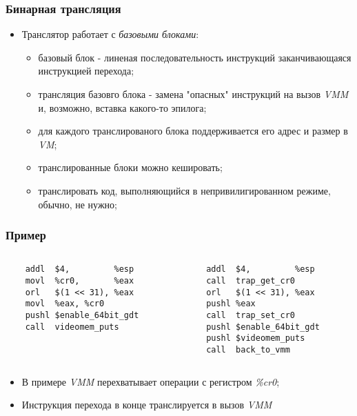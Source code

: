\begin{frame}
\frametitle{Бинарная трансляция}
\begin{itemize}
  \item Транслятор работает с \emph{базовыми блоками}:
    \begin{itemize}
      \item базовый блок - линеная последовательность инструкций заканчивающаяся
            инструкцией перехода;
      \item трансляция базовго блока - замена "опасных" инструкций на вызов
            \emph{VMM} и, возможно, вставка какого-то эпилога;
      \item для каждого транслированого блока поддерживается его адрес и размер
            в \emph{VM};
      \item транслированные блоки можно кешировать;
      \item транслировать код, выполняющийся в непривилигированном режиме,
            обычно, не нужно;
    \end{itemize}
\end{itemize}
\end{frame}

\begin{frame}[fragile]
\frametitle{Пример}
\begin{columns}[T]
  \begin{column}{.4\linewidth}
    \begin{lstlisting}
    addl  $4,         %esp
    movl  %cr0,       %eax
    orl   $(1 << 31), %eax
    movl  %eax, %cr0
    pushl $enable_64bit_gdt
    call  videomem_puts
    \end{lstlisting}
  \end{column}
  \begin{column}{.4\linewidth}
    \begin{lstlisting}
    addl  $4,         %esp
    call  trap_get_cr0
    orl   $(1 << 31), %eax
    pushl %eax
    call  trap_set_cr0
    pushl $enable_64bit_gdt
    pushl $videomem_puts
    call  back_to_vmm
    \end{lstlisting}
  \end{column}
\end{columns}
\begin{itemize}
  \item В примере \emph{VMM} перехватывает операции с регистром \emph{\%cr0};
  \item Инструкция перехода в конце транслируется в вызов \emph{VMM}
\end{itemize}
\end{frame}

